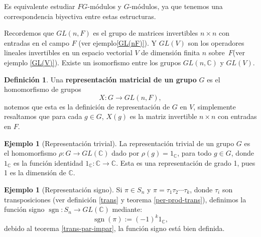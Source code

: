 \documentclass[12pt]{book}
\theoremstyle{definition}
\newtheorem{definition}[theorem]{Definición}
\newtheorem{example}[theorem]{Ejemplo}
\DeclareMathOperator{\sgn}{sgn}
\newcounter{in}
\newcounter{ini}
\begin{document}
Es equivalente estudiar $FG$-módulos y $G$-módulos, ya que tenemos una
correspondencia biyectiva entre estas estructuras.

Recordemos que $GL(n,F)$ es el grupo de matrices invertibles $n\times
n$ con entradas en el campo $F$ (ver ejemplo\ref{GL(nF)}). Y $GL(V)$ son los operadores lineales
invertibles en un espacio vectorial $V$ de dimensión finita $n$ sobre~$F$(ver ejemplo \ref{GL(V)}). Existe un isomorfismo entre los grupos
$GL(n,\mathbb{C})$ y $GL(V)$.

\begin{definition}
  Una \textbf{representación matricial de un grupo} $G$ es el
  homomorfismo de grupos 
  $$X:G\rightarrow GL(n,F),$$
  notemos que esta es la definición de representación de $G$ en $V$, simplemente resaltamos que para cada $g\in G$, $X(g)$  es la
  matriz invertible $n \times n$ con entradas en $F$.
\end{definition}


\begin{example}[Representación trivial]
  La representación trivial de un grupo $G$ es el homomorfismo
  $\rho:G\rightarrow GL(\mathbb{C})$ dado por
  $\rho(g)=1_{\mathbb{C}}$, para todo $g\in G$, donde $1_{\mathbb{C}}$
  es la función identidad $1_{\mathbb{C}}:\mathbb{C}\rightarrow\mathbb{C}$. Esta es una representación de grado 1, pues 1 es la
  dimensión de $\mathbb{C}$.
\end{example}

\begin{example}[Representación signo]
  Si $\pi\in S_{n}$ y $\pi=\tau_{1}\tau_{2}\cdots\tau_{k}$, donde $\tau_{i}$ son
  transposiciones (ver definición \ref{trans} y teorema \ref{per-prod-trans}), definimos la función
  signo $\sgn:S_{n} \rightarrow GL(\mathbb{C})$
  mediante: $$\sgn(\pi):=(-1)^{k}1_{\mathbb{C}},$$
  debido al teorema \ref{trans-par-impar}, la función signo está bien definida.
\end{example}
\end{document}
